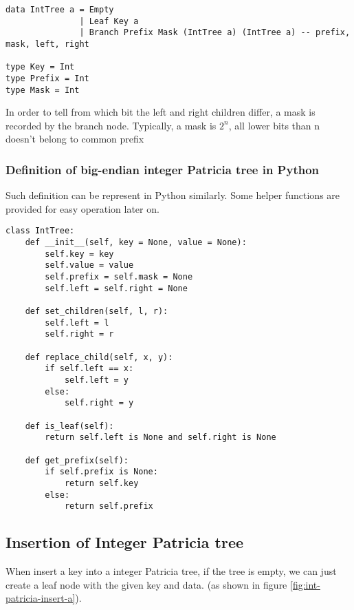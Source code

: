 \documentclass{article}
\begin{document}
\lstset{language=Haskell}
\begin{lstlisting}
data IntTree a = Empty 
               | Leaf Key a
               | Branch Prefix Mask (IntTree a) (IntTree a) -- prefix, mask, left, right

type Key = Int
type Prefix = Int
type Mask = Int
\end{lstlisting}

In order to tell from which bit the left and right children differ, a
mask is recorded by the branch node. Typically, a mask is $2^n$, all
lower bits than n doesn't belong to common prefix

\subsubsection*{Definition of big-endian integer Patricia tree in Python}
Such definition can be represent in Python similarly. Some helper
functions are provided for easy operation later on.

\lstset{language=Python}
\begin{lstlisting}
class IntTree:
    def __init__(self, key = None, value = None):
        self.key = key
        self.value = value
        self.prefix = self.mask = None
        self.left = self.right = None

    def set_children(self, l, r):
        self.left = l
        self.right = r

    def replace_child(self, x, y):
        if self.left == x:
            self.left = y
        else:
            self.right = y

    def is_leaf(self):
        return self.left is None and self.right is None

    def get_prefix(self):
        if self.prefix is None:
            return self.key
        else:
            return self.prefix
\end{lstlisting}

\subsection{Insertion of Integer Patricia tree}
When insert a key into a integer Patricia tree, if the tree is empty,
we can just create a leaf node with the given key and data. (as shown
in figure \ref{fig:int-patricia-insert-a}).
\end{document}
